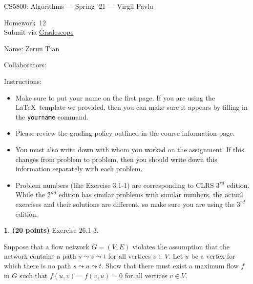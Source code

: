 \documentclass[11pt]{article}
\newcommand{\yourname}{Zerun Tian}
\newcommand{\yourcollaborators}{}
\theoremstyle{definition}
\newcommand{\instructor}{Virgil Pavlu}
\newcommand{\hwnum}{12}
\theoremstyle{theorem}
\newtheorem{prob}{}
\begin{document}
{\Large 
\begin{center}{CS5800: Algorithms} --- Spring '21 --- \instructor \end{center}}
{\large
\vspace{10pt}
\noindent Homework~\hwnum \vspace{2pt}\\
Submit via \href{https://www.gradescope.com/courses/232127}{Gradescope}}

\bigskip
{\large \noindent Name: \yourname }

{\large \noindent Collaborators: \yourcollaborators}

\vspace{15pt}

{\large \noindent Instructions:}

\begin{itemize}

\item Make sure to put your name on the first page.  If you are using the \LaTeX~template we provided, then you can make sure it appears by filling in the \texttt{yourname} command.

\item Please review the grading policy outlined in the course information page.

\item You must also write down with whom you worked on the assignment.  If this changes from problem to problem, then you should write down this information separately with each problem.

\item Problem numbers (like Exercise 3.1-1) are corresponding to CLRS $3^{rd}$ edition.  While the  $2^{nd}$ edition  has  similar  problems  with  similar  numbers,  the  actual  exercises  and their solutions are different, so make sure you are using the $3^{rd}$ edition.

\end{itemize}

\newpage
\begin{prob} \textbf{(20 points)} Exercise 26.1-3.
\end{prob}

Suppose that a flow network $G = (V, E)$ violates the assumption that the network contains a path $s \leadsto v \leadsto t$ for all vertices $v \in V$. Let $u$ be a vertex for which there is no path $s \leadsto u \leadsto t$. Show that there must exist a maximum flow $f$ in $G$ such that $f(u, v) = f(v, u) = 0$ for all vertices $v \in V$.
\end{document}
